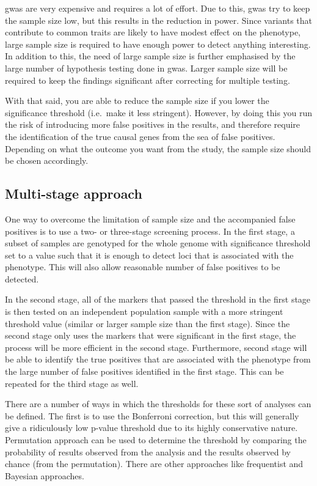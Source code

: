 \Gls{gwas} are very expensive and requires a lot of effort.
Due to this, \gls{gwas} try to keep the sample size low, but this results in the reduction in power.
Since variants that contribute to common traits are likely to have modest effect on the phenotype, large sample size is  required to have enough power  to detect anything interesting.
In addition to this, the need of large sample size is further emphasised by the large number of hypothesis testing done in \gls{gwas}.
Larger sample size will be required to keep the findings significant after correcting for multiple testing.

With that said, you are able to reduce the sample size if you lower the significance threshold (i.e.\ make it less stringent).
However, by doing this you run the risk of introducing more false positives in the results, and therefore require the identification of the true causal genes from the sea of false positives.
Depending on what the outcome you want from the study, the sample size should be chosen accordingly.

\subsection{Multi-stage approach}
\label{sub:multi_stage_approach}

One way to overcome the limitation of sample size and the accompanied false positives is to use a two- or three-stage screening process.
In the first stage, a subset of samples are genotyped for the whole genome with significance threshold set to a value such that it is enough to detect loci that is associated with the phenotype.
This will also allow reasonable number of false positives to be detected.

In the second stage, all of the markers that passed the threshold in the  first stage is then tested on an independent population sample with a more stringent threshold value (similar or larger sample size than the first stage).
Since the second stage only uses the markers that were significant in the first stage, the process  will be more efficient in the second stage.
Furthermore, second stage will be able to identify the true positives that are associated with the phenotype from the large number of false positives identified in the first stage.
This can be repeated for the third stage as well.

There are a number of ways in which the  thresholds for these sort of analyses can be defined.
The first is to use the Bonferroni correction, but this will generally give a ridiculously low p-value threshold due to its highly conservative nature.
Permutation approach can be used to determine the threshold by comparing  the probability of results observed from the analysis and the results observed by chance (from the permutation).
There are other approaches like frequentist and Bayesian approaches.

